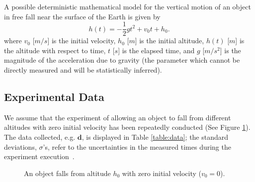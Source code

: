 

A possible deterministic mathematical model for the vertical motion of an object in free fall near the surface of the Earth is given by
\begin{equation}\label{eq:gravity01}
h(t)=-\frac{1}{2} g t^2 + v_0 t + h_0.
\end{equation}
where
$v_0$ [$m/s$] is the initial velocity,
$h_0$ [$m$] is the initial altitude,
$h(t)$ [$m$] is the altitude with respect to time,
$t$ [$s$] is the elapsed time, and
$g$ [$m/s^2$] is the magnitude of the acceleration due to gravity (the parameter which cannot be directly measured and will be statistically inferred).



\subsection{Experimental Data}
We assume that the experiment of allowing an object to fall from different altitudes with zero initial velocity has been repeatedly conducted (See Figure \ref{fig:free_fall}). The data collected, e.g.  $\mathbf{d}$, is displayed in Table \ref{table:data}; the standard deviations, $\sigma$'s, refer to the uncertainties in the measured times during the experiment execution~\cite{interactagram}. 



\begin{figure}[!h]
\centering

\vspace*{-8pt}
\caption{An object falls from altitude $h_0$ with zero initial velocity ($v_0=0$).}
\label{fig:free_fall}
\end{figure}

